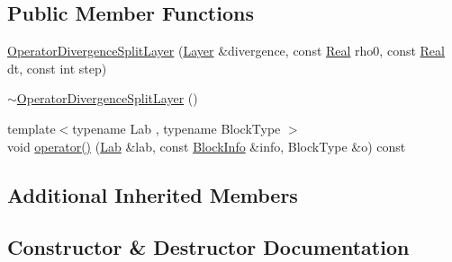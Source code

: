 \subsection*{Public Member Functions}
\begin{DoxyCompactItemize}
\item 
\hyperlink{class_operator_divergence_split_layer_adb870cc91b9c8ac69230cf5f35b625db}{Operator\+Divergence\+Split\+Layer} (\hyperlink{struct_layer}{Layer} \&divergence, const \hyperlink{_h_d_f5_dumper_8h_a445a5f0e2a34c9d97d69a3c2d1957907}{Real} rho0, const \hyperlink{_h_d_f5_dumper_8h_a445a5f0e2a34c9d97d69a3c2d1957907}{Real} dt, const int step)
\item 
\hyperlink{class_operator_divergence_split_layer_a72db398a6d2ecb9ac29b6db752802bda}{$\sim$\+Operator\+Divergence\+Split\+Layer} ()
\item 
{\footnotesize template$<$typename Lab , typename Block\+Type $>$ }\\void \hyperlink{class_operator_divergence_split_layer_a87a9676b91dbe960ebcb4a00463e4aa6}{operator()} (\hyperlink{_definitions_8h_ae720d9054713370bbf4c86860e4dde70}{Lab} \&lab, const \hyperlink{struct_block_info}{Block\+Info} \&info, Block\+Type \&o) const 
\end{DoxyCompactItemize}
\subsection*{Additional Inherited Members}


\subsection{Constructor \& Destructor Documentation}
\hypertarget{class_operator_divergence_split_layer_adb870cc91b9c8ac69230cf5f35b625db}{}

